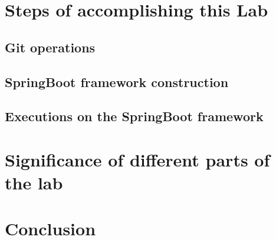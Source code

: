 \documentclass[a4paper]{report}
\begin{document}
\chapter{Steps of accomplishing this Lab}
\section{Git operations}
\section{SpringBoot framework construction}
\section{Executions on the SpringBoot framework}
\chapter{Significance of different parts of the lab}
\chapter{Conclusion}
\end{document}
